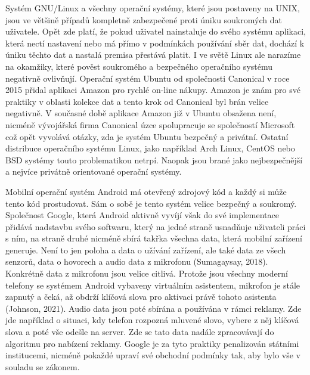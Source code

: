 \documentclass{article}
\begin{document}
\begin{spacing}{1.15}
		Systém GNU/Linux a všechny operační systémy, které jsou postaveny na UNIX, jsou ve většině případů kompletně zabezpečené proti úniku soukromých dat uživatele. Opět zde platí, že pokud uživatel nainstaluje do svého systému aplikaci, která nectí nastavení nebo má přímo v podmínkách používání sběr dat, dochází k úniku těchto dat a nastalá premisa přestává platit. I ve světě Linux ale narazíme na okamžiky, které pověst soukromého a bezpečného operačního systému negativně ovlivňují. Operační systém Ubuntu od společnosti Canonical v roce 2015 přidal aplikaci Amazon pro rychlé on-line nákupy. Amazon je znám pro své praktiky v oblasti kolekce dat a tento krok od Canonical byl brán velice negativně. V současné době aplikace Amazon již v Ubuntu obsažena není, nicméně vývojářská firma Canonical úzce spolupracuje se společností Microsoft což opět vyvolává otázky, zda je systém Ubuntu bezpečný a privátní. Ostatní distribuce operačního systému Linux, jako například Arch Linux, CentOS nebo BSD systémy touto problematikou netrpí. Naopak jsou brané jako nejbezpečnější a nejvíce privátně orientované operační systémy.
		
		Mobilní operační systém Android má otevřený zdrojový kód a každý si může tento kód prostudovat. Sám o sobě je tento systém velice bezpečný a soukromý. Společnost Google, která Android aktivně  vyvíjí však do své implementace přidává nadstavbu svého softwaru, který na jedné straně usnadňuje uživateli práci s ním, na straně druhé nicméně sbírá takřka všechna data, která mobilní zařízení generuje. Není to jen poloha a data o užívání zařízení, ale také data ze všech senzorů, data o hovorech a audio data z mikrofonu (Sumagaysay, 2018). Konkrétně data z mikrofonu jsou velice citlivá. Protože jsou všechny moderní telefony se systémem Android vybaveny virtuálním asistentem, mikrofon je stále zapnutý a čeká, až obdrží klíčová slova pro aktivaci právě tohoto asistenta (Johnson, 2021). Audio data jsou poté sbírána a používána v rámci reklamy. Zde jde například o situaci, kdy telefon rozpozná mluvené slovo, vybere z něj klíčová slova a poté vše odešle na server. Zde se tato data nadále zpracovávají do algoritmu pro nabízení reklamy. Google je za tyto praktiky penalizován státními institucemi, nicméně pokaždé upraví své obchodní podmínky tak, aby bylo vše v souladu se zákonem.
		

\end{spacing}
\end{document}
